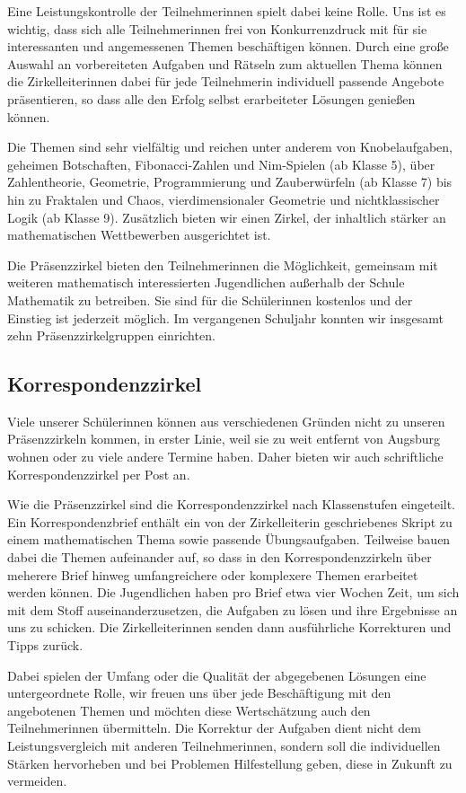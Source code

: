 \documentclass[12pt]{zettel}
\begin{document}
Eine Leistungskontrolle der Teilnehmerinnen spielt dabei keine Rolle. Uns ist es wichtig, dass sich alle Teilnehmerinnen frei von Konkurrenzdruck mit für sie interessanten
und angemessenen Themen beschäftigen können. Durch eine große Auswahl an vorbereiteten Aufgaben und Rätseln zum aktuellen Thema können die Zirkelleiterinnen dabei für
jede Teilnehmerin individuell passende Angebote präsentieren, so dass alle den Erfolg selbst erarbeiteter Lösungen genießen können.

Die Themen sind sehr vielfältig und reichen unter anderem von
Knobelaufgaben, geheimen Botschaften, Fibonacci-Zahlen und Nim-Spielen (ab Klasse 5),
über Zahlentheorie, Geometrie, Programmierung und Zauberwürfeln (ab Klasse 7) bis hin zu
Fraktalen und Chaos, vierdimensionaler Geometrie und nichtklassischer Logik
(ab Klasse 9). Zusätzlich bieten wir einen Zirkel, der inhaltlich stärker an
mathematischen Wettbewerben ausgerichtet ist.

Die Präsenzzirkel bieten den Teilnehmerinnen die Möglichkeit,
gemeinsam mit weiteren mathematisch interessierten Jugendlichen außerhalb der
Schule Mathematik zu betreiben. Sie sind für die Schülerinnen kostenlos und der Einstieg ist jederzeit möglich. Im vergangenen Schuljahr konnten wir insgesamt zehn
Präsenzzirkelgruppen einrichten.

\subsection{Korrespondenzzirkel}

Viele unserer Schülerinnen können aus verschiedenen Gründen
nicht zu unseren Präsenzzirkeln kommen, in erster Linie, weil sie zu weit
entfernt von Augsburg wohnen oder zu viele andere Termine haben.
Daher bieten wir auch schriftliche Korrespondenzzirkel per Post
an.

Wie die Präsenzzirkel sind die Korrespondenzzirkel nach Klassenstufen eingeteilt. Ein
Korrespondenzbrief enthält ein von der Zirkelleiterin geschriebenes Skript zu einem mathematischen Thema sowie passende
Übungsaufgaben. Teilweise bauen dabei die Themen aufeinander auf, so dass in den Korrespondenzzirkeln über meherere Brief hinweg umfangreichere oder komplexere Themen erarbeitet
werden können. Die Jugendlichen haben pro Brief etwa vier Wochen Zeit, um sich
mit dem Stoff auseinanderzusetzen, die Aufgaben zu lösen und ihre Ergebnisse
an uns zu schicken. Die Zirkelleiterinnen senden dann
ausführliche Korrekturen und Tipps zurück.

Dabei spielen der Umfang oder die Qualität der abgegebenen Lösungen eine untergeordnete Rolle, wir freuen uns über jede Beschäftigung
mit den angebotenen Themen und möchten diese Wertschätzung auch den Teilnehmerinnen übermitteln. Die Korrektur der Aufgaben dient nicht dem Leistungsvergleich mit anderen
Teilnehmerinnen, sondern soll die individuellen Stärken hervorheben und bei Problemen Hilfestellung geben, diese in Zukunft zu vermeiden.
\end{document}
